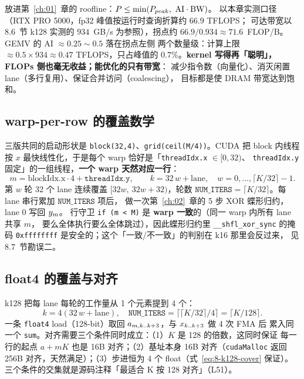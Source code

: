放进第~\ref{ch:01}~章的 roofline：$P \le \min(P\sb{peak},\ \mathrm{AI} \cdot \mathrm{BW})$。
以本章实测口径（RTX PRO 5000，fp32 峰值按运行时查询折算约 $66.9$ TFLOPS；
可达带宽以 8.6~节 k128 实测的 $934$~GB/s 为参照），拐点约
$66.9 / 0.934 \approx 71.6$~FLOP/B。GEMV 的 AI $\approx 0.25 \sim 0.5$ 落在拐点左侧
两个数量级：计算上限 $\approx 0.5 \times 934 \approx 0.47$ TFLOPS，只占峰值的
$0.7\%$。\textbf{kernel 写得再「聪明」，FLOPs 侧也毫无收益；能优化的只有带宽}：
减少指令数（向量化）、消灭闲置 lane（多行复用）、保证合并访问（coalescing），
目标都是使 DRAM 带宽达到饱和。

\subsection{warp-per-row 的覆盖数学}

三版共同的启动形状是 \texttt{block(32,4)}、\texttt{grid\allowbreak{}(ceil\allowbreak{}(M/\allowbreak{}4))}。CUDA 把 block 内线程
按 $x$ 最快线性化，于是每个 warp 恰好是「\texttt{threadIdx.x} $\in [0,32)$、
\texttt{threadIdx.y} 固定」的一组线程，\textbf{一个 warp 天然对应一行}：
\begin{equation}
  m = \mathrm{blockIdx.x} \cdot 4 + \texttt{threadIdx.y} ,
  \qquad
  k = 32\,w + \mathrm{lane},\quad w = 0, \dots, \lceil K/32 \rceil - 1 .
  \label{eq:8-k32-cover}
\end{equation}
第 $w$ 轮 32 个 lane 连续覆盖 $[32w,\ 32w+32)$，轮数
$\texttt{NUM\_ITERS} = \lceil K/32 \rceil$。每 lane 串行累加 $\texttt{NUM\_ITERS}$ 项后，
做一次第~\ref{ch:02}~章的 5 步 XOR 蝶形归约，lane 0 写回 $y\sb{m}$。
行守卫 \texttt{if (m < M)} 是 \textbf{warp 一致}的（同一 warp 内所有 lane 共享 $m$，
要么全体执行要么全体跳过），因此蝶形归约里 \texttt{\_\allowbreak{}\_\allowbreak{}shfl\_\allowbreak{}xor\_\allowbreak{}sync} 的掩码
\texttt{0xffffffff} 是安全的；这个「一致/不一致」的判别在 k16 那里会反过来，
见 8.7~节勘误二。

\subsection{float4 的覆盖与对齐}

k128 把每 lane 每轮的工作量从 1 个元素提到 4 个：
\begin{equation}
  k = 4(32\,w + \mathrm{lane}), \quad
  \texttt{NUM\_ITERS} = \lceil\lceil K/32 \rceil / 4\rceil = \lceil K/128 \rceil .
  \label{eq:8-k128-cover}
\end{equation}
一条 \texttt{float4} load（128-bit）取回 $a\sb{m,k..k+3}$，与 $x\sb{k..k+3}$ 做 4 次 FMA 后
累入同一个 \texttt{sum}。对齐需要三个条件同时成立：（1）$K$ 是 128 的倍数，这同时保证
每一行的起点 $a + mK$ 也是 16B 对齐；（2）基址本身 16B 对齐（\texttt{cudaMalloc}
返回 256B 对齐，天然满足）；（3）步进恒为 4 个 float（式~\ref{eq:8-k128-cover} 保证）。
三个条件的交集就是源码注释「最适合 K 按 128 对齐」（L51）。

